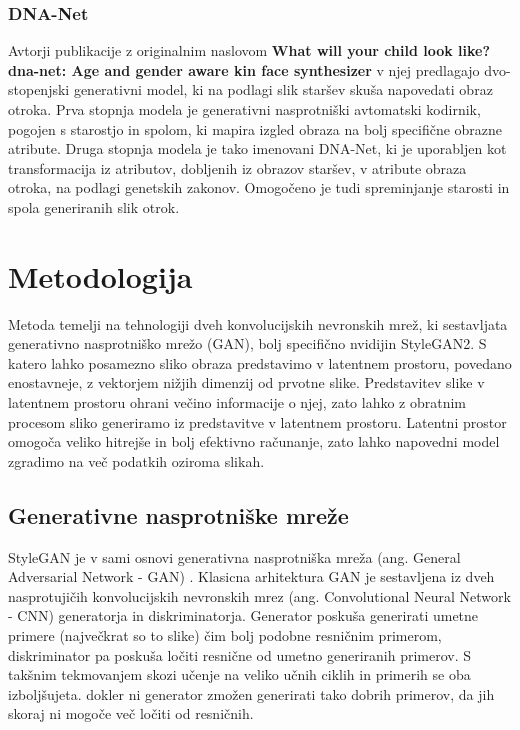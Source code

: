 \documentclass[a4paper,12pt,openright]{book}
\begin{document}
\subsection{DNA-Net}
Avtorji publikacije z originalnim naslovom \textbf{What will your child look like? dna-net: Age and gender aware kin face synthesizer} \cite{Gao2021WhatWY} v njej predlagajo dvo-stopenjski generativni model, ki na podlagi slik staršev skuša napovedati obraz otroka. Prva stopnja modela je generativni nasprotniški avtomatski kodirnik, pogojen s starostjo in spolom, ki mapira izgled obraza na bolj specifične obrazne atribute. Druga stopnja modela je tako imenovani DNA-Net, ki je uporabljen kot transformacija iz atributov, dobljenih iz obrazov staršev, v atribute obraza otroka, na podlagi genetskih zakonov. Omogočeno je tudi spreminjanje starosti in spola generiranih slik otrok.



\chapter{Metodologija}
Metoda temelji na tehnologiji dveh konvolucijskih nevronskih mrež, ki sestavljata generativno nasprotniško mrežo (GAN), bolj specifično nvidijin StyleGAN2. S katero lahko posamezno sliko obraza predstavimo v latentnem prostoru, povedano enostavneje, z vektorjem nižjih dimenzij od prvotne slike. Predstavitev slike v latentnem prostoru ohrani večino informacije o njej, zato lahko z obratnim procesom sliko generiramo iz predstavitve v latentnem prostoru. Latentni prostor omogoča veliko hitrejše in bolj efektivno računanje, zato lahko napovedni model zgradimo na več podatkih oziroma slikah. 


\section{Generativne nasprotniške mreže}
StyleGAN je v sami osnovi generativna nasprotniška mreža (ang. General Adversarial Network - GAN) \cite{goodfellow2014generative}. Klasicna arhitektura GAN je sestavljena iz dveh nasprotujičih konvolucijskih nevronskih mrez (ang. Convolutional Neural Network - CNN) \cite{} generatorja in diskriminatorja. Generator poskuša generirati umetne primere (največkrat so to slike) čim bolj podobne resničnim primerom, diskriminator pa poskuša ločiti resnične od umetno generiranih primerov. S takšnim tekmovanjem skozi učenje na veliko učnih ciklih in primerih se oba izboljšujeta. dokler ni generator zmožen generirati tako dobrih primerov, da jih skoraj ni mogoče več ločiti od resničnih.
\end{document}
